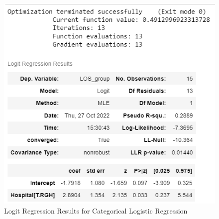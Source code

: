 \documentclass[../thesis.tex]{subfiles}
\begin{document}
\begin{figure}[h!]
    \centering
    \includegraphics{Chapters/Chapter3New/Figures/Logit_cat_results.png}
    \caption{Logit Regression Results for Categorical Logistic Regression}
    \label{fig:OLSCatLogReg}
\end{figure}
\end{document}
